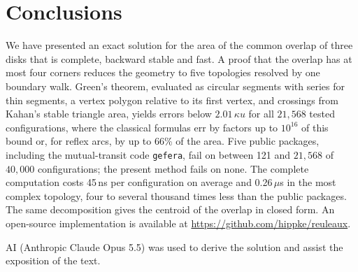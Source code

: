 \documentclass[twocolumn]{aastex701}
\begin{document}
\section{Conclusions} \label{sec:conclusion}

We have presented an exact solution for the area of the common overlap of
three disks that is complete, backward stable and fast. A proof that the
overlap has at most four corners reduces the geometry to five topologies
resolved by one boundary walk. Green's theorem, evaluated as circular
segments with series for thin segments, a vertex polygon relative to its
first vertex, and crossings from Kahan's stable triangle area, yields
errors below $2.01\,\kappa u$ for all $21{,}568$ tested configurations, where
the classical formulas err by factors up to $10^{16}$ of this bound or,
for reflex arcs, by up to 66\% of the area. Five public packages,
including the mutual-transit code \texttt{gefera}, fail on between 121
and $21{,}568$ of $40{,}000$ configurations; the present method fails on
none. The complete computation costs 45\,ns per configuration on average
and 0.26\,$\mu$s in the most complex topology, four to several thousand
times less than the public packages. The same decomposition gives the centroid of the overlap in
closed form. An open-source implementation is available at
\url{https://github.com/hippke/reuleaux}.

\begin{acknowledgments}
AI (Anthropic Claude Opus 5.5) was used to derive the solution and assist
the exposition of the text.
\end{acknowledgments}


{}

\end{document}
